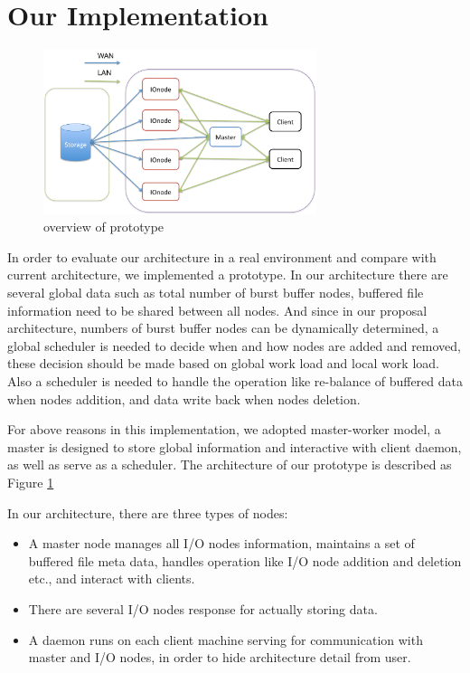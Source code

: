 \section{Our Implementation}
\label{sec:implementation}

\begin{figure}
\centering
\includegraphics[width=8cm]{img/prototype_overview}
\caption{overview of prototype}
\label{implemetation:overview of prototype}
\end{figure}

In order to evaluate our architecture in a real environment and compare with current architecture,
we implemented a prototype.
In our architecture there are several global data such as total number of burst buffer nodes,
buffered file information need to be shared between all nodes.
And since in our proposal architecture, numbers of burst buffer nodes can be dynamically determined,
a global scheduler is needed to decide when and how nodes are added and removed, these decision
should be made based on global work load and local work load.
Also a scheduler is needed to handle the operation like re-balance of buffered data when nodes
addition, and data write back when nodes deletion.

For above reasons in this implementation, we adopted master-worker model, a master is designed to
store global information and interactive with client daemon, as well as serve as a scheduler.
The architecture of our prototype is described as Figure \ref{implemetation:overview of prototype}

In our architecture, there are three types of nodes:
\begin{itemize}
	\item A master node manages all I/O nodes information, maintains a set of buffered file meta data,
	handles operation like I/O node addition and deletion etc., and interact with clients.
	\item There are several I/O nodes response for actually storing data.
	\item A daemon runs on each client machine serving for communication with
	master and I/O nodes, in order to hide architecture detail from user.
\end{itemize}


